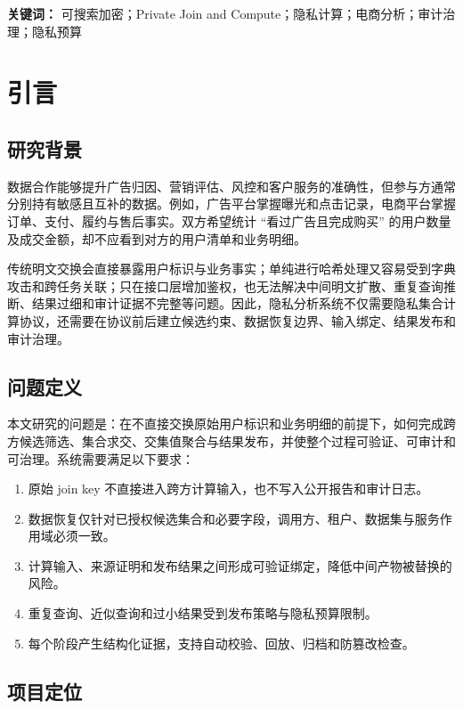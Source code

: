 \documentclass[UTF8,a4paper,12pt,oneside]{ctexrep}
\begin{document}
\vspace{1em}
\noindent\textbf{关键词：} 可搜索加密；Private Join and Compute；隐私计算；电商分析；审计治理；隐私预算

\tableofcontents
\clearpage
{}

\chapter{引言}

\section{研究背景}

数据合作能够提升广告归因、营销评估、风控和客户服务的准确性，但参与方通常分别持有敏感且互补的数据。例如，广告平台掌握曝光和点击记录，电商平台掌握订单、支付、履约与售后事实。双方希望统计 ``看过广告且完成购买'' 的用户数量及成交金额，却不应看到对方的用户清单和业务明细。

传统明文交换会直接暴露用户标识与业务事实；单纯进行哈希处理又容易受到字典攻击和跨任务关联；只在接口层增加鉴权，也无法解决中间明文扩散、重复查询推断、结果过细和审计证据不完整等问题。因此，隐私分析系统不仅需要隐私集合计算协议，还需要在协议前后建立候选约束、数据恢复边界、输入绑定、结果发布和审计治理。

\section{问题定义}

本文研究的问题是：在不直接交换原始用户标识和业务明细的前提下，如何完成跨方候选筛选、集合求交、交集值聚合与结果发布，并使整个过程可验证、可审计和可治理。系统需要满足以下要求：

\begin{enumerate}
  \item 原始 join key 不直接进入跨方计算输入，也不写入公开报告和审计日志。
  \item 数据恢复仅针对已授权候选集合和必要字段，调用方、租户、数据集与服务作用域必须一致。
  \item 计算输入、来源证明和发布结果之间形成可验证绑定，降低中间产物被替换的风险。
  \item 重复查询、近似查询和过小结果受到发布策略与隐私预算限制。
  \item 每个阶段产生结构化证据，支持自动校验、回放、归档和防篡改检查。
\end{enumerate}

\section{项目定位}
\end{document}
